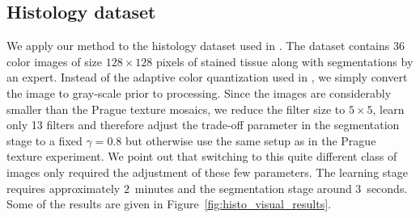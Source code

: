 \documentclass[journal]{IEEEtran}
\begin{document}
\subsection{Histology dataset}
We apply our method to the histology dataset used in \cite{mccann2014}. The dataset contains 36 color images of size $128\times 128$ pixels of stained tissue along with segmentations by an expert. Instead of the adaptive color quantization used in \cite{mccann2014}, we simply convert the image to gray-scale prior to processing. Since the images are considerably smaller than the Prague texture mosaics, we reduce the filter size to $5\times 5$, learn only 13 filters and therefore adjust the trade-off parameter in the  segmentation stage to a fixed $\gamma=0.8$ but otherwise use the same setup as in the Prague texture experiment. 
We point out that switching to this quite different class of images
only required the adjustment of these few parameters.
The learning stage requires approximately $2$~minutes
and the segmentation stage around $3$~seconds.
Some of the results
are given in Figure~\ref{fig:histo_visual_results}. 
\end{document}
